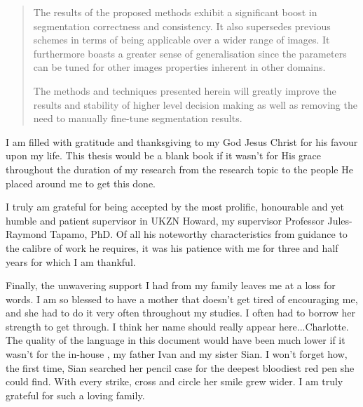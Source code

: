 \documentclass[
11pt, %
english, %
singlespacing, %
liststotoc, %
headsepline, %
]{MastersDoctoralThesis} %
\begin{document}
\begin{abstract}
The results of the proposed methods exhibit a significant boost in segmentation correctness and consistency. It also supersedes previous schemes in terms of being applicable over a wider range of images. It furthermore boasts a greater sense of generalisation since the parameters can be tuned for other images properties inherent in other domains.

The methods and techniques presented herein will greatly improve the results and stability of higher level decision making as well as removing the need to manually fine-tune segmentation results.
\end{abstract}


\begin{acknowledgements}
\addchaptertocentry{\acknowledgementname} %

I am filled with gratitude and thanksgiving to my God Jesus Christ for his favour upon my life. This thesis would be a blank book if it wasn't for His grace throughout the duration of my research from the research topic to the people He placed around me to get this done.
 
I truly am grateful for being accepted by the most prolific, honourable and yet humble and patient supervisor in UKZN Howard, my supervisor Professor Jules-Raymond Tapamo, PhD. Of all his noteworthy characteristics from guidance to the calibre of work he requires, it was his patience with me for three and half years for which I am thankful.

Finally, the unwavering support I had from my family leaves me at a loss for words. I am so blessed to have a mother that doesn't get tired of encouraging me, and she had to do it very often throughout my studies. I often had to borrow her strength to get through. I think her name should really appear here...Charlotte. The quality of the language in this document would have been much lower if it wasn't for the in-house \textsf{}, my father Ivan and my sister Sian. I won't forget how, the first time, Sian searched her pencil case for the deepest bloodiest red pen she could find. With every strike, cross and circle her smile grew wider. I am truly grateful for such a loving family.

\end{acknowledgements}
\end{document}
